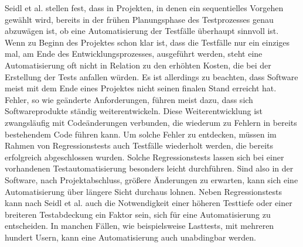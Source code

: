 Seidl et al. \cite[vgl. S.22]{seidl_basiswissen_2012} stellen fest, dass in Projekten, in denen ein sequentielles Vorgehen gewählt wird, bereits in der frühen Planungsphase des Testprozesses genau abzuwägen ist, ob eine Automatisierung der Testfälle überhaupt sinnvoll ist.
Wenn zu Beginn des Projektes schon klar ist, dass die Testfälle nur ein einziges mal, am Ende des Entwicklungsprozesses, ausgeführt werden, steht eine Automatisierung oft nicht in Relation zu den erhöhten Kosten, die bei der Erstellung der Tests anfallen würden.
Es ist allerdings zu beachten, dass Software meist mit dem Ende eines Projektes nicht seinen finalen Stand erreicht hat. Fehler, so wie geänderte Anforderungen, führen meist dazu, dass sich Softwareprodukte ständig weiterentwickeln.
Diese Weiterentwicklung ist zwangsläufig mit Codeänderungen verbunden, die wiederum zu Fehlern in bereits bestehendem Code führen kann.
Um solche Fehler zu entdecken, müssen im Rahmen von Regressionstests auch Testfälle wiederholt werden, die bereits erfolgreich abgeschlossen wurden.
Solche Regressionstests lassen sich bei einer vorhandenen Testautomatisierung besonders leicht durchführen. Sind also in der Software, nach Projektabschluss, größere Änderungen zu erwarten, kann sich eine Automatisierung über längere Sicht durchaus lohnen.
Neben Regressionstests kann nach Seidl et al. \cite[vgl. S.23]{seidl_basiswissen_2012} auch die Notwendigkeit einer höheren Testtiefe oder einer breiteren Testabdeckung ein Faktor sein, sich für eine Automatisierung zu entscheiden.
In manchen Fällen, wie beispielsweise Lasttests, mit mehreren hundert Usern, kann eine Automatisierung auch unabdingbar werden.


